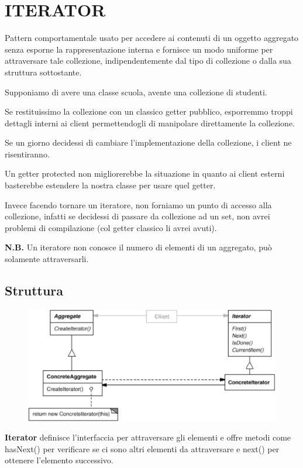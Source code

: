 \chapter{ITERATOR}

Pattern comportamentale usato per accedere ai contenuti di un oggetto aggregato senza esporne la rappresentazione interna e fornisce un modo uniforme per 
attraversare tale collezione, indipendentemente dal tipo di collezione o dalla sua struttura sottostante.

Supponiamo di avere una classe scuola, avente una collezione di studenti.

Se restituissimo la collezione con un classico getter pubblico, esporremmo troppi dettagli interni ai client permettendogli di manipolare direttamente la collezione.

Se un giorno decidessi di cambiare l'implementazione della collezione, i client ne risentiranno.

Un getter protected non migliorerebbe la situazione in quanto ai client esterni basterebbe estendere la nostra classe per usare quel getter.

Invece facendo tornare un iteratore, non forniamo un punto di accesso alla collezione, infatti se decidessi di passare da collezione ad un set, non avrei problemi 
di compilazione (col getter classico li avrei avuti).

\textbf{N.B.} Un iteratore non conosce il numero di elementi di un aggregato, può solamente attraversarli.

\section{Struttura}

\begin{figure}[H]
    \centering
    \includegraphics[width=0.5\linewidth]{../../immagini/iterator/struttura_visitor}
\end{figure}

\textbf{Iterator} definisce l'interfaccia per attraversare gli elementi e offre metodi come hasNext() per verificare se ci sono altri elementi da attraversare e next()
per ottenere l'elemento successivo.

